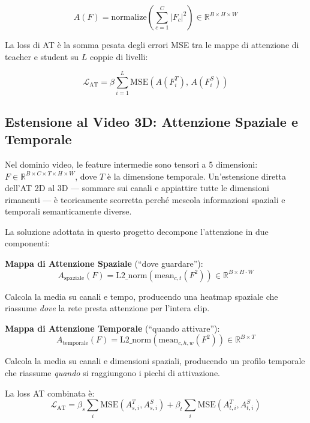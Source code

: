 \begin{equation}
    A(F) = \text{normalize}\left(\sum_{c=1}^{C} |F_c|^2\right) \in \mathbb{R}^{B \times H \times W}
\end{equation}

La loss di AT è la somma pesata degli errori MSE tra le mappe di attenzione di teacher e student su $L$ coppie di livelli:

\begin{equation}
    \mathcal{L}_{\text{AT}} = \beta \sum_{i=1}^{L} \text{MSE}\!\left(A(F^T_i),\, A(F^S_i)\right)
\end{equation}

\subsection{Estensione al Video 3D: Attenzione Spaziale e Temporale}
\label{sec:at_3d}

Nel dominio video, le feature intermedie sono tensori a 5 dimensioni: $F \in \mathbb{R}^{B \times C \times T \times H \times W}$, dove $T$ è la dimensione temporale. Un'estensione diretta dell'AT 2D al 3D --- sommare sui canali e appiattire tutte le dimensioni rimanenti --- è teoricamente scorretta perché mescola informazioni spaziali e temporali semanticamente diverse.

La soluzione adottata in questo progetto decompone l'attenzione in due componenti:

\textbf{Mappa di Attenzione Spaziale} (``dove guardare''):
\begin{equation}
    A_{\text{spaziale}}(F) = \text{L2\_norm}\left(\text{mean}_{c,t}(F^2)\right) \in \mathbb{R}^{B \times H \cdot W}
\end{equation}

Calcola la media su canali e tempo, producendo una heatmap spaziale che riassume \textit{dove} la rete presta attenzione per l'intera clip.

\textbf{Mappa di Attenzione Temporale} (``quando attivare''):
\begin{equation}
    A_{\text{temporale}}(F) = \text{L2\_norm}\left(\text{mean}_{c,h,w}(F^2)\right) \in \mathbb{R}^{B \times T}
\end{equation}

Calcola la media su canali e dimensioni spaziali, producendo un profilo temporale che riassume \textit{quando} si raggiungono i picchi di attivazione.

La loss AT combinata è:
\begin{equation}
    \mathcal{L}_{\text{AT}} = \beta_s \sum_i \text{MSE}(A^T_{s,i}, A^S_{s,i}) + \beta_t \sum_i \text{MSE}(A^T_{t,i}, A^S_{t,i})
\end{equation}

